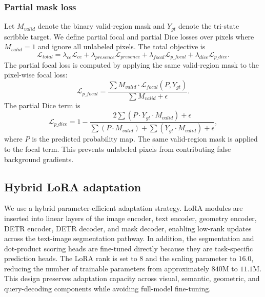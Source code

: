 \documentclass[preprint,12pt]{elsarticle}
\begin{document}
\subsubsection{Partial mask loss}

Let $M_{valid}$ denote the binary valid-region mask and $Y_{gt}$ denote the tri-state scribble target. We define partial focal and partial Dice losses over pixels where $M_{valid}=1$ and ignore all unlabeled pixels. The total objective is
\begin{equation}
    \mathcal{L}_{total} =
    \lambda_{ce}\mathcal{L}_{ce}
    + \lambda_{presence}\mathcal{L}_{presence}
    + \lambda_{focal}\mathcal{L}_{p\_focal}
    + \lambda_{dice}\mathcal{L}_{p\_dice}.
\end{equation}
The partial focal loss is computed by applying the same valid-region mask to the pixel-wise focal loss:
\begin{equation}
    \mathcal{L}_{p\_focal} =
    \frac{\sum M_{valid} \cdot \mathcal{L}_{focal}(P, Y_{gt})}
    {\sum M_{valid} + \epsilon}.
\end{equation}
The partial Dice term is
\begin{equation}
    \mathcal{L}_{p\_dice} =
    1 -
    \frac{2\sum(P \cdot Y_{gt} \cdot M_{valid}) + \epsilon}
    {\sum(P \cdot M_{valid}) + \sum(Y_{gt} \cdot M_{valid}) + \epsilon},
\end{equation}
where $P$ is the predicted probability map. The same valid-region mask is applied to the focal term. This prevents unlabeled pixels from contributing false background gradients.

\subsection{Hybrid LoRA adaptation}

We use a hybrid parameter-efficient adaptation strategy. LoRA modules are inserted into linear layers of the image encoder, text encoder, geometry encoder, DETR encoder, DETR decoder, and mask decoder, enabling low-rank updates across the text-image segmentation pathway. In addition, the segmentation and dot-product scoring heads are fine-tuned directly because they are task-specific prediction heads. The LoRA rank is set to $8$ and the scaling parameter to $16.0$, reducing the number of trainable parameters from approximately $840$M to $11.1$M. This design preserves adaptation capacity across visual, semantic, geometric, and query-decoding components while avoiding full-model fine-tuning.
\end{document}
